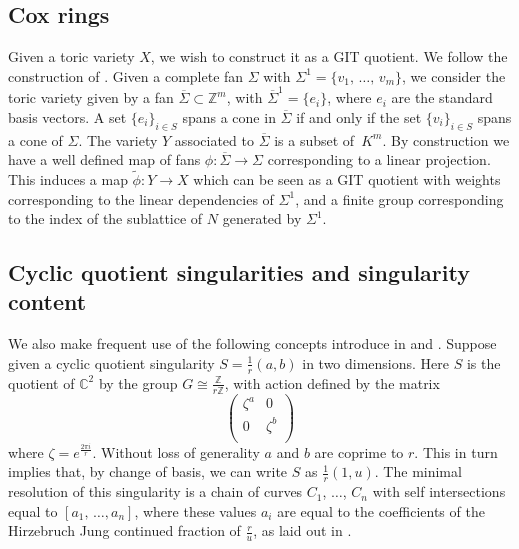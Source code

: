 \documentclass[12pt,a4paper]{book}      %
\newcommand{\mb}[1]{\mathbb{#1}}
\newcommand{\ra}{\rightarrow}
\begin{document}
\subsection{Cox rings}
Given a toric variety $X$, we wish to construct it as a GIT quotient. We follow the construction of \cite{cox}. Given a complete fan $\Sigma$ with $\Sigma^1 = \{ v_1, \, \dots , \, v_m\}$, we consider the toric variety given by a fan $\overline{\Sigma} \subset \mb{Z}^m$, with
$\overline{\Sigma}^1 = \{e_i\}$, where $e_i$ are the standard basis vectors. A set $\{e_i\}_{i \in S}$ spans a cone in $\overline{\Sigma}$ if and only if the set $\{v_i \}_{i \in S}$ spans a cone of $\Sigma$. The variety $Y$ associated to $\overline{\Sigma}$ is a subset of~$K^m$. By construction we have a well defined map of fans $\phi \colon \overline{\Sigma} \ra \Sigma$ corresponding to a linear projection. This induces a map $\tilde{\phi} \colon Y \ra X$ which can be seen as a GIT quotient with weights corresponding to the linear dependencies of $\Sigma^1$, and a finite group corresponding to the index of the sublattice of $N$ generated by $\Sigma^1$.

\subsection{Cyclic quotient singularities and singularity content}

We also make frequent use of the following concepts introduce in \cite{Reid-cyclic} and \cite{SingContent}. Suppose given a cyclic quotient singularity $S=\frac{1}{r}(a,b)$ in two dimensions. Here $S$ is the quotient of $\mb{C}^2$ by the group $G \cong \frac{\mb{Z}}{r\mb{Z}}$, with action defined by the matrix
\[
\left(
\begin{array}{cc}
\zeta^a & 0 \\
0 & \zeta^b \\
\end{array}
\right)
\]
where $\zeta = e^{\frac{2 \pi i}{r}}$. Without loss of generality $a$ and $b$ are coprime to $r$. This in turn implies that, by change of basis, we can write $S$ as $\frac{1}{r}(1,u)$. The minimal resolution of this singularity is a chain of curves $C_1$, $\dots$, $C_n$ with self intersections equal to $[a_1,\, \dots , a_n]$, where these values $a_i$ are equal to the coefficients of the Hirzebruch Jung continued fraction of $\frac{r}{u}$, as laid out in \cite{Reid-cyclic}.
\end{document}
